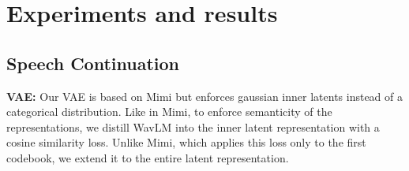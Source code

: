 \section{Experiments and results}
\label{sec:results}




\subsection{Speech Continuation}

\noindent\textbf{VAE:}
Our VAE is based on Mimi \citep{moshi} but enforces gaussian inner latents instead of a categorical distribution. Like in Mimi, to enforce semanticity of the representations, we distill WavLM into the inner latent representation with a cosine similarity loss. Unlike Mimi, which applies this loss only to the first codebook, we extend it to the entire latent representation.
\begin{table}[h]
\caption{\textbf{Speech compression models.} Our VAE is on par with the VQ-VAE on acoustic quality (MOSNeT) and outperforms it on semantic discriminability (ABX),  PESQ \cite{pesq} and STOI \cite{stoi} and a MUSHRA for acoustic quality.}

\centering

\begin{tiny}\begin{sc}
\label{tab:codec_speech}
\end{sc}
\end{tiny}
\end{table}


